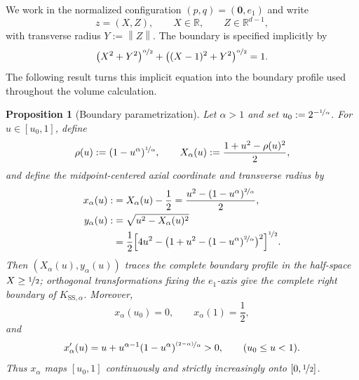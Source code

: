 \documentclass[a4paper,fleqn]{cas-dc}
\newtheorem{proposition}{Proposition}
\theoremstyle{definition}
\theoremstyle{remark}
\newcommand{\R}{\mathds{R}}
\newcommand{\norm}[1]{\left\lVert #1\right\rVert}
\newcommand{\0}{\mathbf{0}}
\begin{document}
We work in the normalized configuration $(p,q)=(\0,e_1)$ and write
\begin{equation}
z=(X,Z),\qquad X\in\R,\qquad Z\in\R^{d-1},
\end{equation}
with transverse radius $Y:=\norm{Z}$. The boundary is specified implicitly by
\begin{equation}
\left(X^2+Y^2\right)^{\nicefrac{\alpha}{2}}
+
\left((X-1)^2+Y^2\right)^{\nicefrac{\alpha}{2}}
=1.
\end{equation}
The following result turns this implicit equation into the boundary profile
used throughout the volume calculation.

\begin{proposition}[Boundary parametrization]
\label{prop:boundary-parametrization}
Let $\alpha>1$ and set $u_0:=2^{-\nicefrac{1}{\alpha}}$. For
$u\in[u_0,1]$, define
\begin{equation}
\rho(u):=(1-u^\alpha)^{\nicefrac{1}{\alpha}},
\qquad
X_\alpha(u):=\frac{1+u^2-\rho(u)^2}{2},
\end{equation}
and define the midpoint-centered axial coordinate and transverse radius by
\begin{align}
x_\alpha(u)
:&=X_\alpha(u)-\frac12
=\frac{
u^2-(1-u^\alpha)^{\nicefrac{2}{\alpha}}
}{2},
\label{eq:x-alpha}
\\
y_\alpha(u)
:&=\sqrt{u^2-X_\alpha(u)^2}
\notag
\\
&=\frac12\Bigl[
4u^2
-\bigl(
1+u^2-(1-u^\alpha)^{\nicefrac{2}{\alpha}}
\bigr)^2
\Bigr]^{\nicefrac12}.
\label{eq:y-alpha}
\end{align}
Then $(X_\alpha(u),y_\alpha(u))$ traces the complete boundary profile in the
half-space $X\geq \nicefrac{1}{2}$; orthogonal transformations
fixing the $e_1$-axis give the complete right
boundary of $K_{\mathrm{SS},\alpha}$. Moreover,
\begin{equation}
x_\alpha(u_0)=0,
\qquad
x_\alpha(1)=\frac12,
\end{equation}
and
\begin{equation}\label{eq:x-prime}
x_\alpha'(u)
=
u+u^{\alpha-1}(1-u^\alpha)^{\nicefrac{(2-\alpha)}{\alpha}}>0,
\qquad (u_0\leq u<1).
\end{equation}
Thus $x_\alpha$ maps $[u_0,1]$ continuously and strictly increasingly onto
$[0,\nicefrac{1}{2}]$.
\end{proposition}
\end{document}
